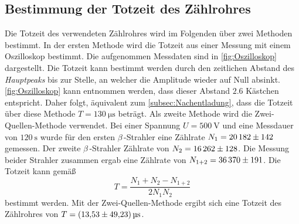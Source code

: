 \subsection{Bestimmung der Totzeit des Zählrohres}
\label{subsec:A_Totzeit}
Die Totzeit des verwendeten Zählrohres wird im Folgenden über zwei Methoden bestimmt. 
In der ersten Methode wird die Totzeit aus einer Messung mit einem Oszilloskop bestimmt. Die aufgenommen Messdaten sind in \autoref{fig:Oszilloskop} dargestellt.
Die Totzeit kann bestimmt werden durch den zeitlichen Abstand des \textit{Hauptpeaks} bis zur Stelle, an welcher die Amplitude wieder auf Null absinkt. \autoref{fig:Oszilloskop} kann entnommen 
werden, dass dieser Abstand $\num{2.6}$ Kästchen entspricht. Daher folgt, äquivalent zum \autoref{subsec:Nachentladung}, dass die Totzeit über diese Methode 
$T = \qty{130}{\micro\second}$ beträgt.
Als zweite Methode wird die Zwei-Quellen-Methode verwendet. Bei einer Spannung $U = \qty{500}{\volt}$ und eine Messdauer von $\qty{120}{\second}$ wurde für den ersten 
$\beta$\,-Strahler eine Zählrate $N_1 = \num{20182 +- 142}$ gemessen. Der zweite $\beta$\,-Strahler Zählrate von $N_2 = \num{16262 +- 128}$. Die Messung beider 
Strahler zusammen ergab eine Zählrate von $N_{1+2} = \num{36370 +- 191}$. 
Die Totzeit kann gemäß 
\begin{equation}
  \label{eqn:Totzeit}
  T = \frac{N_1 + N_2 - N_{1+2}}{2N_1N_2}
\end{equation}
bestimmt werden. Mit der Zwei-Quellen-Methode ergibt sich eine Totzeit des Zählrohres von $T = \qty{13.53+-49.23}{\micro\second}$.

